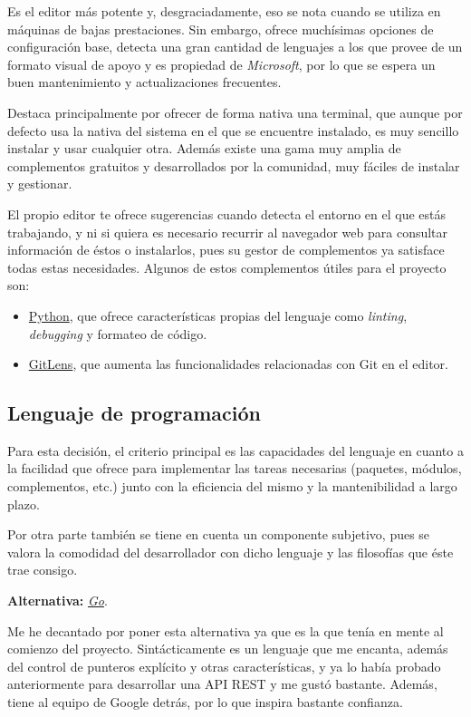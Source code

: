 Es el editor más potente y, desgraciadamente, eso se nota cuando se utiliza en máquinas de bajas prestaciones. Sin embargo, ofrece muchísimas opciones de configuración base, detecta una gran cantidad de lenguajes a los que provee de un formato visual de apoyo y es propiedad de \textit{Microsoft}, por lo que se espera un buen mantenimiento y actualizaciones frecuentes.

Destaca principalmente por ofrecer de forma nativa una terminal, que aunque por defecto usa la nativa del sistema en el que se encuentre instalado, es muy sencillo instalar y usar cualquier otra. Además existe una gama muy amplia de complementos gratuitos y desarrollados por la comunidad, muy fáciles de instalar y gestionar. 

El propio editor te ofrece sugerencias cuando detecta el entorno en el que estás trabajando, y ni si quiera es necesario recurrir al navegador web para consultar información de éstos o instalarlos, pues su gestor de complementos ya satisface todas estas necesidades. Algunos de estos complementos útiles para el proyecto son:
\begin{itemize}
    \item \href{https://marketplace.visualstudio.com/items?itemName=ms-python.python}{Python}, que ofrece características propias del lenguaje como \textit{linting}, \textit{debugging} y formateo de código.
    \item \href{https://marketplace.visualstudio.com/items?itemName=eamodio.gitlens}{GitLens}, que aumenta las funcionalidades relacionadas con Git en el editor.
\end{itemize}

\subsection{Lenguaje de programación}

Para esta decisión, el criterio principal es las capacidades del lenguaje en cuanto a la facilidad que ofrece para implementar las tareas necesarias (paquetes, módulos, complementos, etc.) junto con la eficiencia del mismo y la mantenibilidad a largo plazo.

Por otra parte también se tiene en cuenta un componente subjetivo, pues se valora la comodidad del desarrollador con dicho lenguaje y las filosofías que éste trae consigo.

\textbf{Alternativa:} \href{https://go.dev/}{\textit{Go}}.

Me he decantado por poner esta alternativa ya que es la que tenía en mente al comienzo del proyecto. Sintácticamente es un lenguaje que me encanta, además del control de punteros explícito y otras características, y ya lo había probado anteriormente para desarrollar una API REST y me gustó bastante. Además, tiene al equipo de Google detrás, por lo que inspira bastante confianza.


